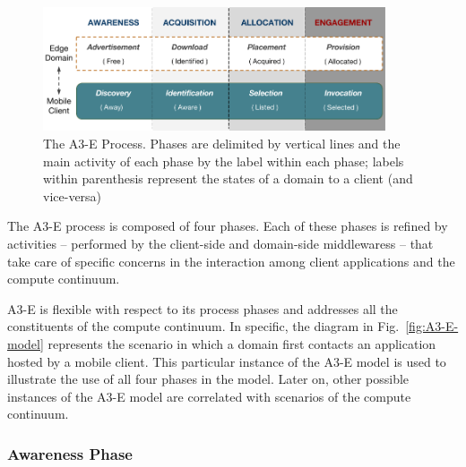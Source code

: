 \begin{figure}[tbp]
	\includegraphics[width=0.9\textwidth]{figs/A3-E.png}
	\caption{The A3-E Process. Phases are delimited by vertical lines and the main activity of each phase by the label within each phase; labels within parenthesis represent the states of a domain to a client (and vice-versa)}
	\label{fig:A3-E-process}
\end{figure}

The A3-E process is composed of four phases. Each of these phases is refined by activities -- performed by the client-side and domain-side middlewaress -- that take care of specific concerns in the interaction among client applications and the compute continuum.

A3-E is flexible with respect to its process phases and addresses all the constituents of the compute continuum. In specific, the diagram in Fig.~\ref{fig:A3-E-model} represents the scenario in which a domain first contacts an application hosted by a mobile client. This particular instance of the A3-E model is used to illustrate the use of all four phases in the model. Later on, other possible instances of the A3-E model are correlated with scenarios of the compute continuum.


\subsubsection*{Awareness Phase}\label{sec:A3-E-awareness}


